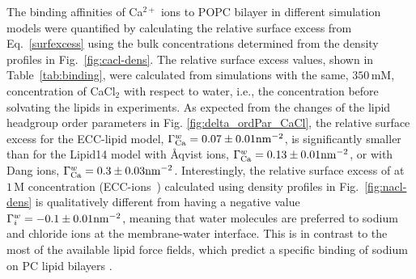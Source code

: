\documentclass[aip,jcp,twocolumn]{revtex4}
\begin{document}
The binding affinities of Ca$^{2+}$ ions to POPC bilayer in different simulation 
models were quantified by calculating the relative surface excess from Eq.~\ref{surfexcess} 
using the bulk concentrations determined from the density profiles in Fig.~\ref{fig:cacl-dens}. 
The relative surface excess values, shown in Table~\ref{tab:binding},
were calculated from simulations with the same, $350\,\mathrm{mM}$, concentration of CaCl$_2$ with 
respect to water, i.e., the concentration before solvating the lipids in experiments.
As expected from the changes of the lipid headgroup order parameters in Fig. \ref{fig:delta_ordPar_CaCl}, 
the relative surface excess for the ECC-lipid model, $\Gamma_{\rm Ca}^w = 0.07 \pm 0.01 \rm{nm}^{-2}$,
is significantly smaller than for the Lipid14 model with \AA{}qvist ions, $\Gamma_{\rm Ca}^w = 0.13 \pm 0.01 \rm{nm}^{-2}$,
or with Dang ions, $\Gamma_{\rm Ca}^w = 0.3 \pm 0.03 \rm{nm}^{-2}$.
Interestingly, the relative surface excess of 
 at $1\,\mathrm{M}$ concentration (ECC-ions~\cite{Pluharova2014}) 
calculated using density profiles in Fig.~\ref{fig:nacl-dens}
is qualitatively different from 
having a negative value $\Gamma_i^w = -0.1 \pm 0.01 \rm{nm}^{-2}$, 
meaning that water molecules are preferred to sodium and chloride ions at the membrane-water interface. 
This is in contrast to the most of the available lipid force fields,
which predict a specific binding of sodium on 
PC lipid bilayers \cite{catte16}.
%
%
\end{document}
